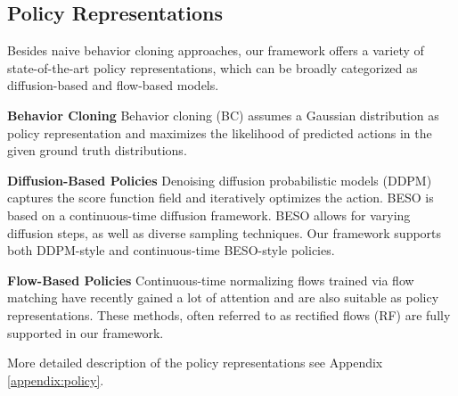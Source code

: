




\subsection{Policy Representations} \label{sec: policy representations}
Besides naive behavior cloning approaches, our framework offers a variety of state-of-the-art policy representations, which can be broadly categorized as diffusion-based and flow-based models.  


\textbf{Behavior Cloning} Behavior cloning (BC) assumes a Gaussian distribution as policy representation and maximizes the likelihood of predicted actions in the given ground truth distributions.


\textbf{Diffusion-Based Policies}
Denoising diffusion probabilistic models (DDPM) \cite{ho2020denoising} captures the score function field and iteratively optimizes the action. BESO \cite{reuss2023goal} is based on a continuous-time diffusion framework. BESO allows for varying diffusion steps, as well as diverse sampling techniques. Our framework supports both DDPM-style and continuous-time BESO-style policies.    

\textbf{Flow-Based Policies}  
Continuous-time normalizing flows trained via flow matching \cite{lipman2022flow} have recently gained a lot of attention and are also suitable as policy representations. 
These methods, often referred to as rectified flows (RF) \cite{liu2022flow} are fully supported in our framework.

More detailed description of the policy representations see Appendix \ref{appendix:policy}.



